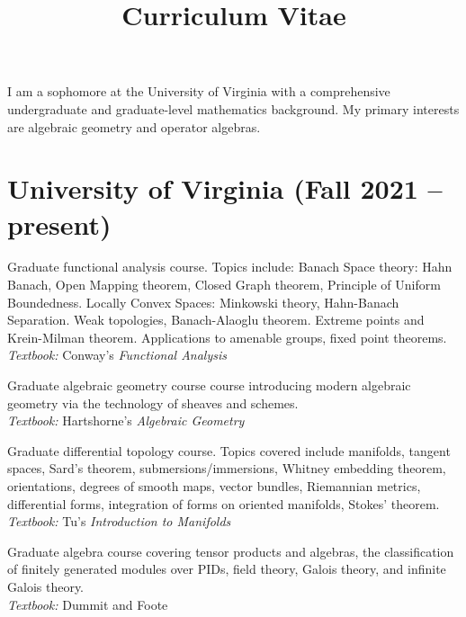 \documentclass[11pt,letterpaper,sans]{moderncv}
\title{Curriculum Vitae}
\begin{document}
\makecvtitle %
\vspace*{-1.5em}



\begin{center}
  I am a sophomore at the University of Virginia with a comprehensive undergraduate and graduate-level mathematics background. My primary interests are algebraic geometry and operator algebras.
\end{center}

\section{University of Virginia (Fall 2021 -- present)}

%
  {Graduate functional analysis course. Topics include: Banach Space theory: Hahn Banach, Open Mapping theorem, Closed Graph theorem, Principle of Uniform Boundedness. Locally Convex Spaces: Minkowski theory, Hahn-Banach Separation. Weak topologies, Banach-Alaoglu theorem. Extreme points and Krein-Milman theorem. Applications to amenable groups, fixed point theorems. \\ \emph{Textbook: }Conway's \emph{Functional Analysis}}

%
  {Graduate algebraic geometry course course introducing modern algebraic geometry via the technology of sheaves and schemes.  \\ \emph{Textbook: }Hartshorne's \emph{Algebraic Geometry}}

%
  {Graduate differential topology course. Topics covered include manifolds, tangent spaces, Sard's theorem, submersions/immersions, Whitney embedding theorem, orientations, degrees of smooth maps, vector bundles, Riemannian metrics, differential forms, integration of forms on oriented manifolds, Stokes' theorem. \\ \emph{Textbook: }Tu's \emph{Introduction to Manifolds}}

%
  {Graduate algebra course covering tensor products and algebras, the classification of finitely generated modules over PIDs, field theory, Galois theory, and infinite Galois theory.  \\ \emph{Textbook: }Dummit and Foote}
\end{document}
